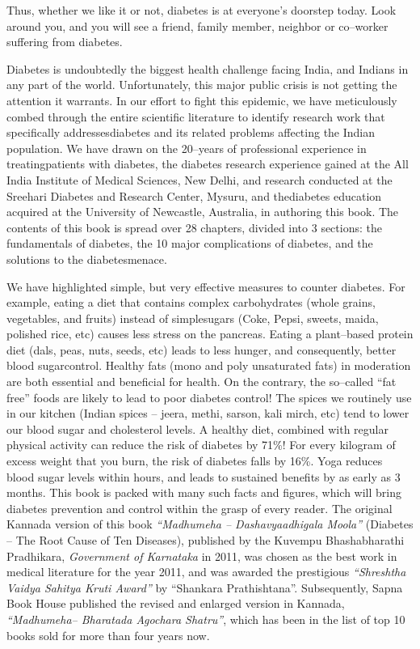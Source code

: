 Thus, whether we like it or not, diabetes is at everyone’s doorstep today. Look around you, and you will see a friend, family member, neighbor or co–worker suffering from diabetes.

Diabetes is undoubtedly the biggest health challenge facing India, and Indians in any part of the world. Unfortunately, this major public crisis is not getting the attention it warrants. In our effort to fight this epidemic, we have meticulously combed through the entire scienti\-fic literature to identify research work that specifically addresses\break diabetes and its related problems affecting the Indian population. We have drawn on the 20–years of professional experience in treating\break patients with diabetes, the diabetes research experience gained at the All India Institute of Medical Sciences, New Delhi, and research condu\-cted at the Sreehari Diabetes and Research Center, Mysuru, and the\break diabetes education acquired at the University of Newcastle, Australia, in authoring this book. The contents of this book is spread over 28 chapters, divided into 3 sections: the fundamentals of diabetes, the 10 major complications of diabetes, and the solutions to the diabetes\break menace.

We have highlighted simple, but very effective measures to cou\-nter diabetes. For example, eating a diet that contains complex carbohydrates (whole grains, vegetables, and fruits) instead of simple\break sugars (Coke, Pepsi, sweets, maida, polished rice, etc) causes less stress on the pancreas. Eating a plant–based protein diet (dals, peas, nuts, seeds, etc) leads to less hunger, and consequently, better blood sugar\break control. Healthy fats (mono and poly unsaturated fats) in moderation are both essential and beneficial for health. On the contrary, the so–called “fat free” foods are likely to lead to poor diabetes control! The spices we routinely use in our kitchen (Indian spices – jeera, methi, sarson, kali mirch, etc) tend to lower our blood sugar and choleste\-rol levels. A healthy diet, combined with regular physical activity can reduce the risk of diabetes by 71\%! For every kilogram of excess weight that you burn, the risk of diabetes falls by 16\%. Yoga reduces blood sugar levels within hours, and leads to sustained benefits by as early as 3 months. This book is packed with many such facts and figures, which will bring diabetes prevention and control within the grasp of every reader. The original Kannada version of this book \textit{“Madhumeha – Dashavyaadhigala Moola”} (Diabetes – The Root Cause of Ten Diseases), published by the Kuvempu Bhashabharathi Pradhikara, \textit{Government of Karnataka} in 2011, was chosen as the best work in medical literature for the year 2011, and was awarded the prestigious \textit{“Shreshtha Vaidya Sahitya Kruti Award”} by “Shankara Prathishtana”. Subsequently, Sapna Book House published the revised and enlarged version in Kannada, \textit{“Madhumeha– Bharatada Agochara Shatru”}, which has been in the list of top 10 books sold for more than four years now.

